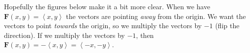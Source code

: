 \documentclass{article}
\newcommand{\lra}[1]{\left\langle #1 \right\rangle}
\newcommand{\F}[0]{\mathbf{F}}
\begin{document}
Hopefully the figures below make it a bit more clear. When we have $\F(x,y)=\lra{x,y}$ the vectors are pointing \textit{away} from the origin. We want the vectors to point \textit{towards} the origin, so we multiply the vectors by $-1$ (flip the direction). If we multiply the vectors by $-1$, then $\F(x,y)=-\lra{x,y}=\lra{-x,-y}$.
\begin{figure}[h]
\centering
\begin{minipage}{.5\textwidth}
  \centering
  


\begin{tikzpicture}[x=0.75pt,y=0.75pt,yscale=-1,xscale=1]


\end{tikzpicture}
\end{minipage}
\end{figure}
\end{document}
